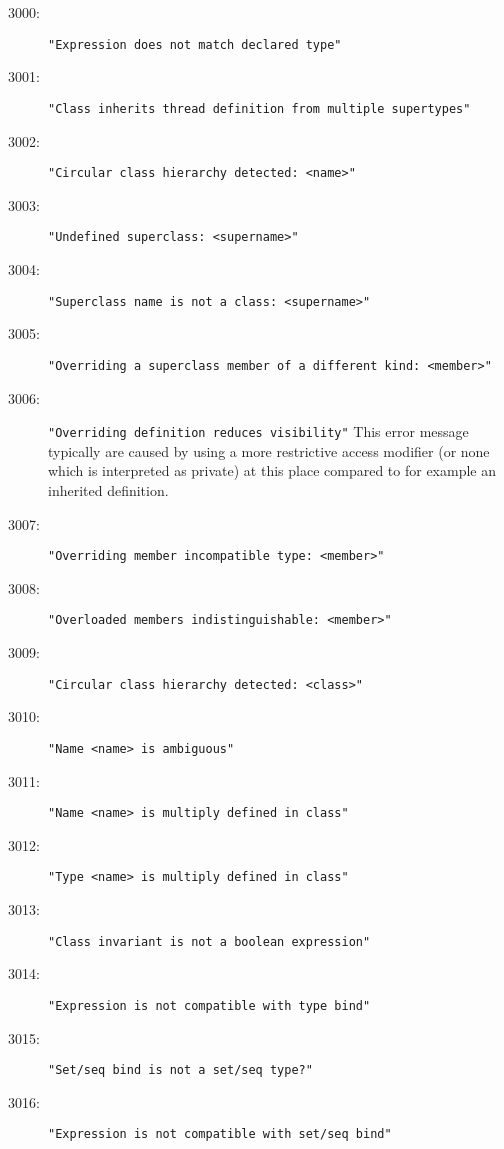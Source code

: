%
%
%

\begin{description}
\item[3000:] \texttt{"Expression does not match declared type"}
\item[3001:] \texttt{"Class inherits thread definition from multiple supertypes"}
\item[3002:] \texttt{"Circular class hierarchy detected:\ <name>"}
\item[3003:] \texttt{"Undefined superclass:\ <supername>"}
\item[3004:] \texttt{"Superclass name is not a class:\ <supername>"}
\item[3005:] \texttt{"Overriding a superclass member of a different kind:\ <member>"}
\item[3006:] \texttt{"Overriding definition reduces visibility"}  This
  error message typically are caused by using a more restrictive
  access modifier (or none which is interpreted as private) at this
  place compared to for example an inherited definition.
\item[3007:] \texttt{"Overriding member incompatible type:\ <member>"}
\item[3008:] \texttt{"Overloaded members indistinguishable:\ <member>"}
\item[3009:] \texttt{"Circular class hierarchy detected:\ <class>"}
\item[3010:] \texttt{"Name <name> is ambiguous"}
\item[3011:] \texttt{"Name <name> is multiply defined in class"}
\item[3012:] \texttt{"Type <name> is multiply defined in class"}
\item[3013:] \texttt{"Class invariant is not a boolean expression"}
\item[3014:] \texttt{"Expression is not compatible with type bind"}
\item[3015:] \texttt{"Set/seq bind is not a set/seq type?"}
\item[3016:] \texttt{"Expression is not compatible with set/seq bind"}

\end{description}
